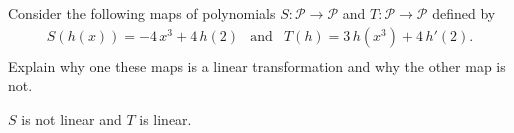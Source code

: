 
\begin{exerciseStatement}


Consider the following maps of polynomials \(S:\mathcal{P}\rightarrow\mathcal{P}\) and \(T:\mathcal{P}\rightarrow\mathcal{P}\) defined by 
\begin{align*} S(h(x))= -4 \, x^{3} + 4 \, h\left(2\right)  & \text{and} & T(h)= 3 \, h\left(x^{3}\right) + 4 \, h'\left(2\right) . \\ \end{align*}
             Explain why one these maps is a linear transformation and why the other map is not. 


\end{exerciseStatement}
    
\begin{exerciseAnswer} 


\(S\) is not linear and \(T\) is linear.


\end{exerciseAnswer}
    
